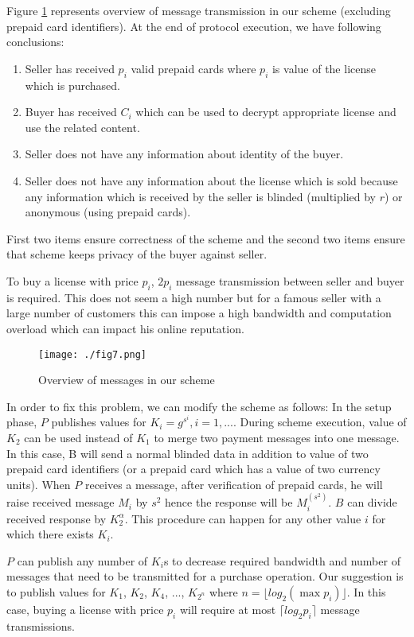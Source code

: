 \documentclass[times]{secauth}
\begin{document}
Figure \ref{fig_messages} represents overview of message transmission in our scheme (excluding prepaid card identifiers).
At the end of protocol execution, we have following conclusions:
\begin{enumerate}
\item Seller has received $p_i$ valid prepaid cards where $p_i$ is value of the license which is purchased.
\item Buyer has received $C_i$ which can be used to decrypt appropriate license and use the related content.
\item Seller does not have any information about identity of the buyer.
\item Seller does not have any information about the license which is sold because any information which is received by the seller is blinded (multiplied by $r$) or anonymous (using prepaid cards).
\end{enumerate}
	
First two items ensure correctness of the scheme and the second two items ensure that scheme keeps privacy of the buyer against seller.

To buy a license with price $p_i$, $2p_i$ message transmission between seller and buyer is required. This does not seem a high number but for a famous seller with a large number of customers this can impose a high bandwidth and computation overload which can impact his online reputation.

\begin{figure}
\centering
\texttt{[image: ./fig7.png]}
\caption{Overview of messages in our scheme}
\label{fig_messages}
\end{figure}

In order to fix this problem, we can modify the scheme as follows:
In the setup phase, $P$ publishes values for $K_i=g^{s^i}, i=1,...$. During scheme execution, value of $K_2$ can be used instead of $K_1$ to merge two payment messages into one message. In this case, B will send a normal blinded data in addition to value of two prepaid card identifiers (or a prepaid card which has a value of two currency units). 
When $P$ receives a message, after verification of prepaid cards, he will raise received message $M_i$ by $s^2$ hence the response will be $M_i^(s^2 )$. $B$ can divide received response by $K_2^\alpha$. This procedure can happen for any other value $i$ for which there exists $K_i$.

$P$ can publish any number of $K_i$s to decrease required bandwidth and number of messages that need to be transmitted for a purchase operation. Our suggestion is to publish values for $K_1$, $K_2$, $K_4$, ..., $K_{2^n}$ where $n=\lfloor log_2(\max{p_i})\rfloor$. In this case, buying a license with price $p_i$ will require at most $\lceil log_2{p_i} \rceil$ message transmissions.
\end{document}
